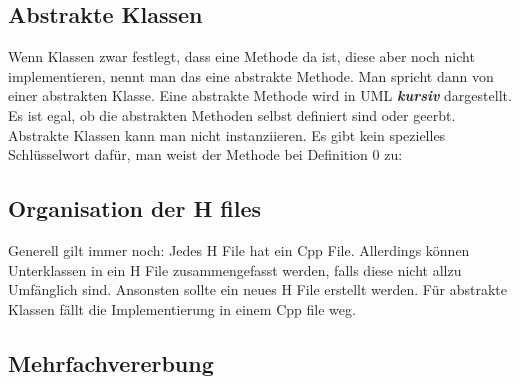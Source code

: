 \begin{center}
\end{center}

\nextcol

\subsection{Abstrakte Klassen}

Wenn Klassen zwar festlegt, dass eine Methode da ist, diese aber noch nicht implementieren, nennt man das eine abstrakte Methode. 
Man spricht dann von einer abstrakten Klasse.
Eine abstrakte Methode wird in UML \textit{\textbf{kursiv}} dargestellt.
Es ist egal, ob die abstrakten Methoden selbst definiert sind oder geerbt. 
Abstrakte Klassen kann man nicht instanziieren.
Es gibt kein spezielles Schlüsselwort dafür, man weist der Methode bei Definition 0 zu: 



\subsection{Organisation der H files}

Generell gilt immer noch: Jedes H File hat ein Cpp File. 
Allerdings können Unterklassen in ein H File zusammengefasst werden, falls diese nicht allzu Umfänglich sind. 
Ansonsten sollte ein neues H File erstellt werden. 
Für abstrakte Klassen fällt die Implementierung in einem Cpp file weg.

\subsection{Mehrfachvererbung}

